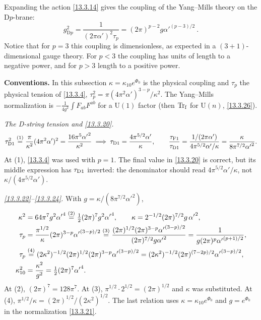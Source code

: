 Expanding the action \eqref{13.3.14} gives the coupling of the Yang--Mills theory on the D$p$-brane:
\begin{equation}
	g_{\mathrm{D}p}^2 = \frac{1}{(2\pi\alpha')^2\tau_p} = (2\pi)^{p-2}g{\alpha'}^{(p-3)/2} \:. \label{13.3.25}
\end{equation}
Notice that for $p = 3$ this coupling is dimensionless, as expected in a $(3 + 1)$-dimensional gauge theory. For $p < 3$ the coupling has units of length to a negative power, and for $p > 3$ length to a positive power.
\begin{tcolorbox}[breakable]
	\begin{remark}
		\textbf{Conventions.} In this subsection $\kappa=\kappa_{10}e^{\Phi_0}$ is the physical coupling and $\tau_p$ the physical tension of \eqref{13.3.4}, $\tau_p^2=\pi(4\pi^2\alpha')^{3-p}/\kappa^2$. The Yang--Mills normalization is $-\frac{1}{4g^2}\int F_{ab}F^{ab}$ for a $\mathrm U(1)$ factor (then $\operatorname{Tr}_{\rm f}$ for $\mathrm U(n)$, \eqref{13.3.26}).

		\textit{The D-string tension and \eqref{13.3.20}.}
		\begin{align*}
			\tau_{\rm D1}^2 \overset{(1)}{=} \frac{\pi}{\kappa^2}(4\pi^2\alpha')^2 = \frac{16\pi^5{\alpha'}^2}{\kappa^2}
			\;\Longrightarrow\; \tau_{\rm D1}=\frac{4\pi^{5/2}\alpha'}{\kappa},\qquad
			\frac{\tau_{\rm F1}}{\tau_{\rm D1}} = \frac{1/(2\pi\alpha')}{4\pi^{5/2}\alpha'/\kappa} = \frac{\kappa}{8\pi^{7/2}{\alpha'}^2} .
		\end{align*}
		At (1), \eqref{13.3.4} was used with $p=1$. The final value in \eqref{13.3.20} is correct, but its middle expression has $\tau_{\rm D1}$ inverted: the denominator should read $4\pi^{5/2}\alpha'/\kappa$, not $\kappa/(4\pi^{5/2}\alpha')$.

		\textit{\eqref{13.3.22}--\eqref{13.3.24}.} With $g=\kappa/(8\pi^{7/2}\alpha'^2)$,
		\begin{align*}
			\kappa^2 &= 64\pi^7g^2{\alpha'}^4 \overset{(2)}{=} \tfrac12(2\pi)^7g^2{\alpha'}^4, \qquad \kappa=2^{-1/2}(2\pi)^{7/2}g\,{\alpha'}^2,\\
			\tau_p &= \frac{\pi^{1/2}}{\kappa}(2\pi)^{3-p}{\alpha'}^{(3-p)/2} \overset{(3)}{=} \frac{(2\pi)^{1/2}(2\pi)^{3-p}{\alpha'}^{(3-p)/2}}{(2\pi)^{7/2}g{\alpha'}^2} = \frac{1}{g(2\pi)^p{\alpha'}^{(p+1)/2}} ,\\
			\tau_p &\overset{(4)}{=} (2\kappa^2)^{-1/2}(2\pi)^{1/2}(2\pi)^{3-p}{\alpha'}^{(3-p)/2} = (2\kappa^2)^{-1/2}(2\pi)^{(7-2p)/2}{\alpha'}^{(3-p)/2},\\
			\kappa_{10}^2 &= \frac{\kappa^2}{g^2} = \tfrac12(2\pi)^7{\alpha'}^4 .
		\end{align*}
		At (2), $(2\pi)^7=128\pi^7$. At (3), $\pi^{1/2}\cdot2^{1/2}=(2\pi)^{1/2}$ and $\kappa$ was substituted. At (4), $\pi^{1/2}/\kappa=(2\pi)^{1/2}/(2\kappa^2)^{1/2}$. The last relation uses $\kappa=\kappa_{10}e^{\Phi_0}$ and $g=e^{\Phi_0}$ in the normalization \eqref{13.3.21}.


\end{remark}
\end{tcolorbox}
